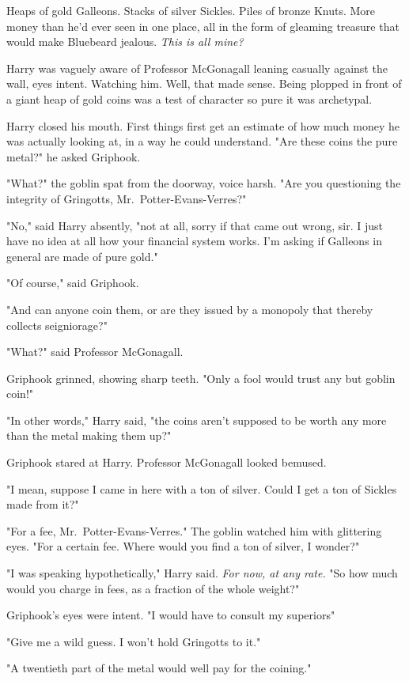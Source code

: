 Heaps of gold Galleons. Stacks of silver Sickles. Piles of
bronze Knuts. More money than he'd ever seen in one
place, all in the form of gleaming treasure that would make
Bluebeard jealous. \emph{This{\el} is all mine?}

Harry was vaguely aware of Professor McGonagall leaning
casually against the wall, eyes intent. Watching him. Well, that made
sense. Being plopped in front of a giant heap of gold coins was a test of
character so pure it was archetypal.

Harry closed his mouth. First things first{\el} get an estimate
of how much money he was actually looking at, in a way
he could understand. "Are these coins the pure metal?" he asked Griphook.

"What?" the goblin spat from the doorway, voice harsh. "Are you
questioning the integrity of Gringotts, Mr.~Potter-Evans-Verres?"

"No," said Harry absently, "not at all, sorry if that came out wrong, sir. I
just have no idea at all how your financial system works. I'm asking if
Galleons in general are made of pure gold."

"Of course," said Griphook.

"And can anyone coin them, or are they issued by a monopoly that thereby
collects seigniorage?"

"What?" said Professor McGonagall.

Griphook grinned, showing sharp teeth. "Only a fool would trust any but goblin
coin!"

"In other words," Harry said, "the coins aren't supposed to be worth any more
than the metal making them up?"

Griphook stared at Harry. Professor McGonagall looked bemused.

"I mean, suppose I came in here with a ton of silver. Could I get a ton of
Sickles made from it?"

"For a fee, Mr.~Potter-Evans-Verres." The goblin watched him with glittering
eyes. "For a certain fee. Where would you find a ton of silver, I wonder?"

"I was speaking hypothetically," Harry said. \emph{For now, at any rate.}
"So{\el} how much would you charge in fees, as a fraction of the whole
weight?"

Griphook's eyes were intent. "I would have to consult my superiors{\el}"

"Give me a wild guess. I won't hold Gringotts to it."

"A twentieth part of the metal would well pay for the coining."

